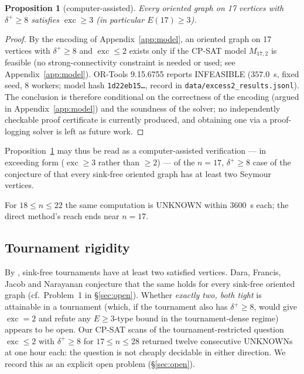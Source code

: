 \documentclass[11pt]{amsart}
\newtheorem{proposition}[theorem]{Proposition}
\theoremstyle{remark}
\newcommand{\exc}{\operatorname{exc}}
\begin{document}
\begin{proposition}[computer-assisted]\label{thm:e17}
Every oriented graph on 17 vertices with $\delta^+ \ge 8$ satisfies
$\exc \ge 3$ (in particular $E(17) \ge 3$).
\end{proposition}

\begin{proof}
By the encoding of Appendix~\ref{app:model}, an oriented graph on 17
vertices with $\delta^+ \ge 8$ and $\exc \le 2$ exists only if the CP-SAT
model $M_{17,2}$ is feasible (no strong-connectivity constraint is needed
or used; see Appendix~\ref{app:model}). OR-Tools 9.15.6755 reports
INFEASIBLE ($357.0$~s, fixed seed, 8 workers; model hash
\texttt{1d22eb15\ldots}, record in
\texttt{data/excess2\_results.jsonl}). The conclusion is therefore
conditional on the correctness of the encoding (argued in
Appendix~\ref{app:model}) and the soundness of the solver; no independently
checkable proof certificate is currently produced, and obtaining one via a
proof-logging solver is left as future work.
\end{proof}

Proposition~\ref{thm:e17} may thus be read as a computer-assisted
verification --- in exceeding form ($\exc \ge 3$ rather than $\ge 2$) ---
of the $n = 17$, $\delta^+ \ge 8$ case of the conjecture of
\cite{DaraFrancisJacobNarayanan2022} that every sink-free oriented graph
has at least two Seymour vertices.

For $18 \le n \le 22$ the same computation is UNKNOWN within 3600~s each;
the direct method's reach ends near $n = 17$.

\subsection*{Tournament rigidity}
By \cite{HavetThomasse2000}, sink-free tournaments have at least two
satisfied vertices. Dara, Francis, Jacob and Narayanan conjecture that the
same holds for every sink-free oriented graph
\cite{DaraFrancisJacobNarayanan2022} (cf.\ Problem~1 in
\S\ref{sec:open}). Whether \emph{exactly two, both tight} is attainable in
a tournament (which, if the tournament also has $\delta^+ \ge 8$, would
give $\exc = 2$ and refute any $E \ge 3$-type bound in the
tournament-dense regime) appears to be open. Our CP-SAT scans of the
tournament-restricted question $\exc \le 2$ with $\delta^+ \ge 8$ for
$17 \le n \le 28$ returned twelve consecutive UNKNOWNs at one hour each:
the question is not cheaply decidable in either direction. We record this
as an explicit open problem (\S\ref{sec:open}).
\end{document}
